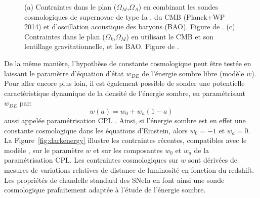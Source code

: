 \documentclass[../main/main.tex]{subfiles}
\begin{document}
\begin{figure}[ht]
\centering
{}\hfill
{}
\caption[]{(a) Contraintes dans le plan
  ($\Omega_{M}$,$\Omega_{\Lambda}$) en combinant les sondes
  cosmologiques de supernovae de type Ia \citep[JLA,][]{Betoule2014}, du
  CMB (Planck+WP 2014) et d'oscillation
  acoustique des baryons (BAO). Figure de \citet{Betoule2014}. (c)
  Contraintes dans le plan ($\Omega_{k}$,$\Omega_{M}$) en utilisant le
  CMB et son lentillage gravitationnelle, et les BAO. Figure de \citet{Planckparams2018}.}
\label{fig:flatcontrainte}
\end{figure}

De la même manière, l'hypothèse de constante cosmologique peut être
testée en laissant le paramètre d'équation d'état $w_{DE}$ de l'énergie
sombre libre (modèle $w$\lcdm). Pour aller encore plus loin, il est
également possible de sonder une potentielle caractéristique dynamique
de la densité de l'énergie sombre, en paramétrisant $w_{DE}$ par:
\begin{equation}
  \label{eq:wCPL}
  w(a)=w_{0}+w_{a}(1-a)
\end{equation}
aussi appelée paramétrisation CPL \citep{CPL2001,Linder2003}. Ainsi, si
l'énergie sombre est en effet une constante cosmologique dans les
équations d'Einstein, alors $w_{0}=-1$ et $w_{a}=0$. La
Figure~\ref{fig:darkenergy} illustre les contraintes récentes,
compatibles avec le modèle \lcdm, sur le
paramètre $w$ et sur les composantes $w_{0}$ et $w_{a}$ de la paramétrisation CPL.
Les contraintes cosmologiques sur $w$
sont dérivées de mesures de variations relatives de distance de
luminosité en fonction du redshift. Les propriétés de chandelle standard
des SNeIa en font ainsi une sonde cosmologique prafaitement adaptée à l'étude
de l'énergie sombre.
\end{document}

